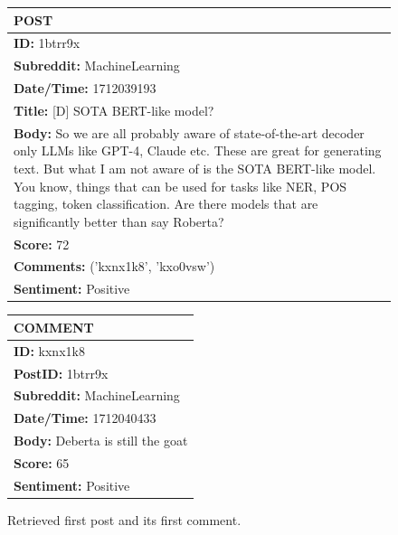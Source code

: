     \FloatBarrier
    \begin{figure}[ht]
        \begin{minipage}[t]{0.45\textwidth}
            \centering
            \begin{tabular}{|p{7cm}|}
                \hline
                \textbf{POST} \\  \hline \hline
                \textbf{ID:} 1btrr9x \\ \hline
                \textbf{Subreddit:} MachineLearning \\ \hline
                \textbf{Date/Time:} 1712039193 \\ \hline
                \textbf{Title:} [D] SOTA BERT-like model? \\ \hline
                \textbf{Body:} So we are all probably aware of state-of-the-art decoder only LLMs like GPT-4, Claude etc. These are great for generating text. But what I am not aware of is the SOTA BERT-like model. You know, things that can be used for tasks like NER, POS tagging, token classification. Are there models that are significantly better than say Roberta? \\ \hline
                \textbf{Score:} 72 \\ \hline
                \textbf{Comments:} ('kxnx1k8', 'kxo0vsw') \\ \hline
                \textbf{Sentiment:} Positive \\ \hline
            \end{tabular}
        \end{minipage}
        \hfill
        \begin{minipage}[t]{0.45\textwidth}
            \centering
            \begin{tabular}{|p{7cm}|}
                \hline
                \textbf{COMMENT} \\ \hline \hline
                \textbf{ID:} kxnx1k8 \\ \hline
                \textbf{PostID:} 1btrr9x \\ \hline
                \textbf{Subreddit:} MachineLearning \\ \hline
                \textbf{Date/Time:} 1712040433 \\ \hline
                \textbf{Body:} Deberta is still the goat \\ \hline
                \textbf{Score:} 65 \\ \hline
                \textbf{Sentiment:} Positive \\ \hline
            \end{tabular}
        \end{minipage}
        \caption{Retrieved first post and its first comment.}
        \label{fig:post_comment}
    \end{figure}
    \FloatBarrier

